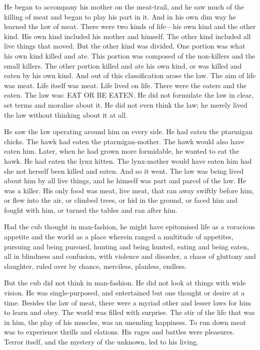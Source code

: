 \documentclass[10pt]{book}
\begin{document}
He began to accompany his mother on the meat-trail, and he saw much of
the killing of meat and began to play his part in it. And in his own
dim way he learned the law of meat. There were two kinds of life—his
own kind and the other kind. His own kind included his mother and
himself. The other kind included all live things that moved. But the
other kind was divided. One portion was what his own kind killed and
ate. This portion was composed of the non-killers and the small
killers. The other portion killed and ate his own kind, or was killed
and eaten by his own kind. And out of this classification arose the
law. The aim of life was meat. Life itself was meat. Life lived on
life. There were the eaters and the eaten. The law was: EAT OR BE
EATEN. He did not formulate the law in clear, set terms and moralise
about it. He did not even think the law; he merely lived the law
without thinking about it at all.

He saw the law operating around him on every side. He had eaten the
ptarmigan chicks. The hawk had eaten the ptarmigan-mother. The hawk
would also have eaten him. Later, when he had grown more formidable, he
wanted to eat the hawk. He had eaten the lynx kitten. The lynx-mother
would have eaten him had she not herself been killed and eaten. And so
it went. The law was being lived about him by all live things, and he
himself was part and parcel of the law. He was a killer. His only food
was meat, live meat, that ran away swiftly before him, or flew into the
air, or climbed trees, or hid in the ground, or faced him and fought
with him, or turned the tables and ran after him.

Had the cub thought in man-fashion, he might have epitomised life as a
voracious appetite and the world as a place wherein ranged a multitude
of appetites, pursuing and being pursued, hunting and being hunted,
eating and being eaten, all in blindness and confusion, with violence
and disorder, a chaos of gluttony and slaughter, ruled over by chance,
merciless, planless, endless.

But the cub did not think in man-fashion. He did not look at things
with wide vision. He was single-purposed, and entertained but one
thought or desire at a time. Besides the law of meat, there were a
myriad other and lesser laws for him to learn and obey. The world was
filled with surprise. The stir of the life that was in him, the play of
his muscles, was an unending happiness. To run down meat was to
experience thrills and elations. His rages and battles were pleasures.
Terror itself, and the mystery of the unknown, led to his living.
\end{document}

